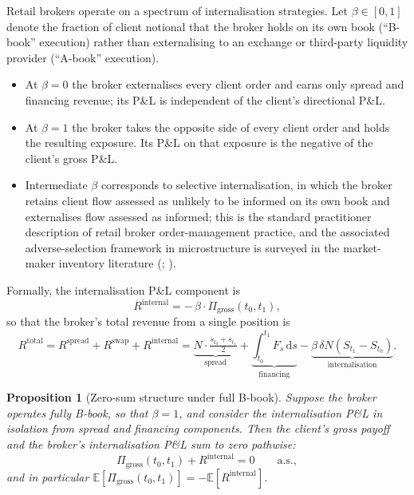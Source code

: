 \documentclass[preprint,12pt,authoryear]{elsarticle}
\newcommand{\EE}{\mathbb{E}}
\newcommand{\dd}{\mathrm{d}}
\newtheorem{proposition}{Proposition}[section]
\theoremstyle{definition}
\begin{document}
Retail brokers operate on a spectrum of internalisation strategies.
Let $\beta \in [0, 1]$ denote the fraction of client notional that the
broker holds on its own book (``B-book'' execution) rather than
externalising to an exchange or third-party liquidity provider
(``A-book'' execution).
\begin{itemize}
    \item At $\beta = 0$ the broker externalises every client order and
    earns only spread and financing revenue; its P\&L is independent
    of the client's directional P\&L.
    \item At $\beta = 1$ the broker takes the opposite side of every
    client order and holds the resulting exposure. Its P\&L on that
    exposure is the negative of the client's gross P\&L.
    \item Intermediate $\beta$ corresponds to selective
    internalisation, in which the broker retains client flow assessed
    as unlikely to be informed on its own book and externalises flow
    assessed as informed; this is the standard practitioner
    description of retail broker order-management practice, and the
    associated adverse-selection framework in microstructure is
    surveyed in the market-maker inventory literature
    (\citealp{OHara1995}; \citealp{Harris2003}).
\end{itemize}
Formally, the internalisation P\&L component is
\begin{equation}
    R^{\text{internal}}
    = -\, \beta \cdot \Pi_{\text{gross}}(t_0, t_1),
    \label{eq:r-internal}
\end{equation}
so that the broker's total revenue from a single position is
\begin{equation}
    R^{\text{total}}
    = R^{\text{spread}} + R^{\text{swap}} + R^{\text{internal}}
    = \underbrace{
        N \cdot \tfrac{s_{t_0} + s_{t_1}}{2}
      }_{\text{spread}}
    + \underbrace{
        \int_{t_0}^{t_1} F_s \, \dd s
      }_{\text{financing}}
    - \underbrace{
        \beta \, \delta N (S_{t_1} - S_{t_0})
      }_{\text{internalisation}}.
    \label{eq:r-total}
\end{equation}

\begin{proposition}[Zero-sum structure under full B-book]
\label{prop:zero-sum}
Suppose the broker operates fully B-book, so that $\beta = 1$, and
consider the internalisation P\&L in isolation from spread and
financing components. Then the client's gross payoff and the broker's
internalisation P\&L sum to zero pathwise:
\begin{equation}
    \Pi_{\text{gross}}(t_0, t_1) + R^{\text{internal}} = 0
    \qquad \text{a.s.},
    \label{eq:zero-sum}
\end{equation}
and in particular
$\EE[\Pi_{\text{gross}}(t_0, t_1)] = -\EE[R^{\text{internal}}]$.
\end{proposition}
\end{document}
